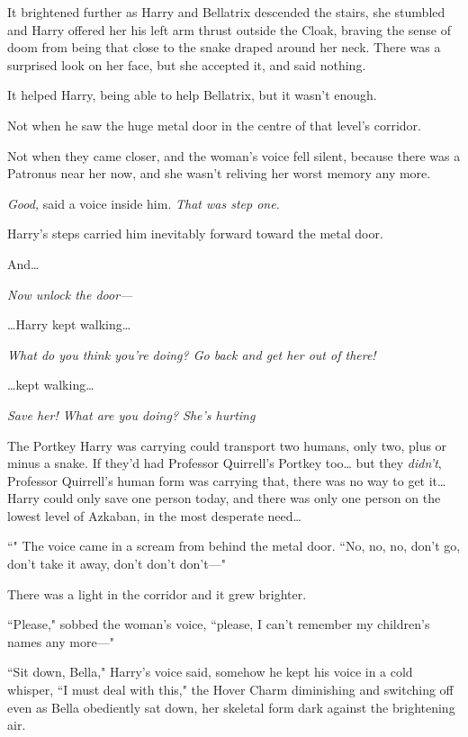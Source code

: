 It brightened further as Harry and Bellatrix descended the stairs, she stumbled and Harry offered her his left arm thrust outside the Cloak, braving the sense of doom from being that close to the snake draped around her neck. There was a surprised look on her face, but she accepted it, and said nothing.

It helped Harry, being able to help Bellatrix, but it wasn't enough.

Not when he saw the huge metal door in the centre of that level's corridor.

Not when they came closer, and the woman's voice fell silent, because there was a Patronus near her now, and she wasn't reliving her worst memory any more.

\emph{Good,} said a voice inside him. \emph{That was step one.}

Harry's steps carried him inevitably forward toward the metal door.

And{\ldots}

\emph{Now unlock the door—}

{\ldots}Harry kept walking{\ldots}

\emph{What do you think you're doing? Go back and get her out of there!}

{\ldots}kept walking{\ldots}

\emph{Save her! What are you doing? She's hurting }

The Portkey Harry was carrying could transport two humans, only two, plus or minus a snake. If they'd had Professor Quirrell's Portkey too{\ldots} but they \emph{didn't}, Professor Quirrell's human form was carrying that, there was no way to get it{\ldots} Harry could only save one person today, and there was only one person on the lowest level of Azkaban, in the most desperate need{\ldots}

``" The voice came in a scream from behind the metal door. ``No, no, no, don't go, don't take it away, don't don't don't—"

There was a light in the corridor and it grew brighter.

``Please," sobbed the woman's voice, ``please, I can't remember my children's names any more—"

``Sit down, Bella," Harry's voice said, somehow he kept his voice in a cold whisper, ``I must deal with this," the Hover Charm diminishing and switching off even as Bella obediently sat down, her skeletal form dark against the brightening air.

